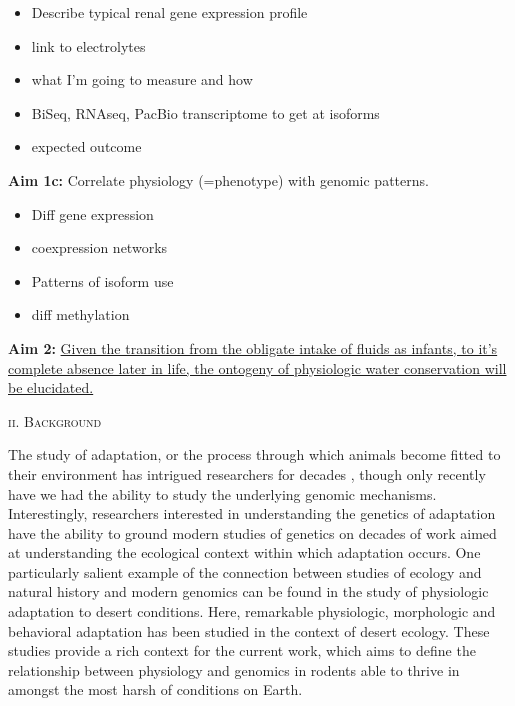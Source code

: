 \documentclass[11pt]{article}
\begin{document}
\begin{itemize}
\item Describe typical renal gene expression profile
\item link to electrolytes
\item what I'm going to measure and how
\item BiSeq, RNAseq, PacBio transcriptome to get at isoforms
\item expected outcome
\end{itemize}



\noindent \textbf{Aim 1c:} Correlate physiology (=phenotype) with genomic patterns. \\

\begin{itemize}
\item Diff gene expression
\item coexpression networks
\item Patterns of isoform use
\item diff methylation
\end{itemize}





\noindent \textbf{Aim 2:} \ul{Given the transition from the obligate intake of fluids as infants, to it’s complete absence later in life, the ontogeny of physiologic water conservation will be elucidated.} \\













\newpage

\begin{center}
\textsc{{ii. Background}} \\
\end{center}

The study of adaptation, or the process through which animals become fitted to their environment has intrigued researchers for decades \citep{Darwin:1859tm, Fisher:1930wy}, though only recently have we had the ability to study the underlying genomic mechanisms. Interestingly, researchers interested in understanding the genetics of adaptation have the ability to ground modern studies of genetics on decades of work aimed at understanding the ecological context within which adaptation occurs. One particularly salient example of the connection between studies of ecology and natural history and modern genomics can be found in the study of physiologic adaptation to desert conditions. Here, remarkable physiologic, morphologic \citep{Dickinson:2007jn,Huntley:1984us,SchmidtNielsen:1950wg,SchmidtNielsen:1952wp} and behavioral \citep{NAGY:1994vd} adaptation has been studied in the context of desert ecology. These studies provide a rich context for the current work, which aims to define the relationship between physiology and genomics in rodents able to thrive in amongst the most harsh of conditions on Earth.  
\end{document}
